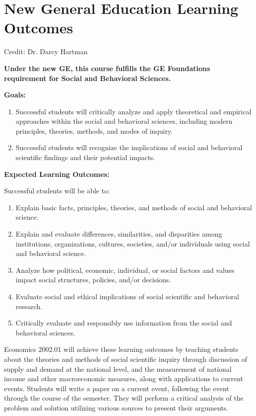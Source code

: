 \documentclass[12pt]{article}
\begin{document}
\newpage

\section*{New General Education Learning Outcomes}
\label{sec:New_General_Education_Learning_Outcomes}

Credit: Dr. Darcy Hartman

\textbf{Under the new GE, this course fulfills the GE Foundations requirement for Social and Behavioral Sciences.} 

\textbf{Goals:}
\begin{enumerate}
    \item Successful students will critically analyze and apply theoretical and empirical approaches within the social and behavioral sciences, including modern principles, theories, methods, and modes of inquiry.
    \item Successful students will recognize the implications of social and behavioral scientific findings and their potential impacts.
\end{enumerate}

\textbf{Expected Learning Outcomes:}

Successful students will be able to:

\begin{enumerate}
    \item Explain basic facts, principles, theories, and methods of social and behavioral science.
    \item Explain and evaluate differences, similarities, and disparities among institutions, organizations, cultures, societies, and/or individuals using social and behavioral science.
    \item Analyze how political, economic, individual, or social factors and values impact social structures, policies, and/or decisions.
    \item Evaluate social and ethical implications of social scientific and behavioral research.
    \item Critically evaluate and responsibly use information from the social and behavioral sciences.
\end{enumerate}

Economics 2002.01 will achieve these learning outcomes by teaching students about the theories and methods of social scientific inquiry through discussion of supply and demand at the national level, and the measurement of national income and other macroeconomic measures, along with applications to current events. Students will write a paper on a current event, following the event through the course of the semester. They will perform a critical analysis of the problem and solution utilizing various sources to present their arguments.
\end{document}
